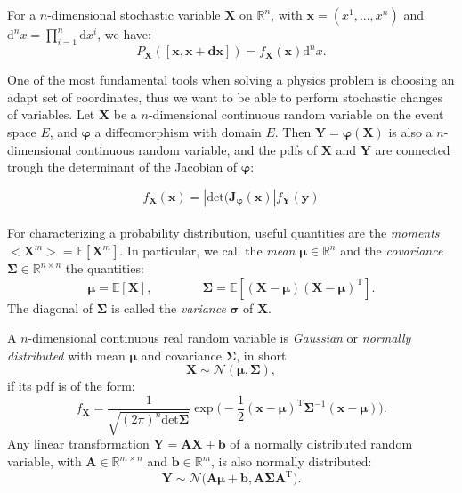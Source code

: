 \documentclass[a4paper,12pt]{book}
\begin{document}
For a $n$-dimensional stochastic variable $\bm{X}$ on $\mathbb{R}^n$, with $\bm{x} = (x^1,...,x^n)$ and  $\mathrm{d}^nx = \prod_{i=1}^n \mathrm{d}x^i$, we have:
\begin{equation}
    P_{\bm{X}}([\bm{x} , \bm{x}+\mathbf{d}\bm{x}]) = f_{\bm{X}}(\bm{x}) \mathrm{d}^nx.
\end{equation}


One of the most fundamental tools when solving a physics problem is choosing an adapt set of coordinates, thus we want to be able to perform stochastic changes of variables. 
Let $\bm{X}$ be a $n$-dimensional continuous random variable on the event space $E$, and $\bm{\varphi}$ a diffeomorphism with domain $E$. Then $\bm{Y} = \bm{\varphi}(\bm{X})$ is also a $n$-dimensional continuous random variable, and the \acrshort{pdf}s of $\bm{X}$ and $\bm{Y}$ are connected trough the determinant of the Jacobian of $\bm{\varphi}$:

\begin{equation}
    f_{\bm{X}}(\bm{x}) = | \mathrm{det}(\bm{J}_{\bm{\varphi}}(\bm{x}) |  f_{\bm{Y}}(\bm{y})
\end{equation}
\\
For characterizing a probability distribution, useful quantities are the \textit{moments} $\bigl<\bm{X}^m\bigr> = \mathbb{E}[\bm{X}^m]$. In particular, we call the \textit{mean} $\bm{\mu}\in \mathbb{R}^n$ and the \textit{covariance} $\bm{\Sigma} \in \mathbb{R}^{n\times n}$ the quantities:
\begin{equation}
    \bm{\mu} = \mathbb{E}[\bm{X}], \quad \quad \quad \quad \bm{\Sigma} = \mathbb{E}[(\bm{X}-\bm{\mu})(\bm{X}-\bm{\mu})^\mathrm{T}].
\end{equation}
The diagonal of  $\bm{\Sigma}$ is called the \textit{variance}  $\bm{\sigma}$ of $\bm{X}$. 


A $n$-dimensional continuous real random variable is \textit{Gaussian} or \textit{normally distributed} with mean $\bm{\mu}$ and covariance $\bm{\Sigma}$, in short
\begin{equation}
    \bm{X} \sim \mathcal{N}(\bm{\mu},\bm{\Sigma}),
\end{equation}
if its \acrshort{pdf} is of the form:
\begin{equation}
    f_{\bm{X}} = \frac{1}{\sqrt{(2\pi)^n \mathrm{det}\bm{\Sigma}}} \exp\bigl(-\frac{1}{2}(\bm{x}-\bm{\mu})^\mathrm{T}\bm{\Sigma}^{-1}(\bm{x}-\bm{\mu})\bigr).
\end{equation}
Any linear transformation $\bm{Y} = \bm{AX} + \bm{b}$ of a normally distributed random variable, with $\bm{A} \in \mathbb{R}^{m\times n}$ and $\bm{b} \in \mathbb{R}^{m}$, is also normally distributed:
\begin{equation}
    \bm{Y} \sim \mathcal{N}\bigl(\bm{A\mu}+\bm{b},\bm{A\Sigma A}^\mathrm{T}\bigr).
\end{equation}
\end{document}
